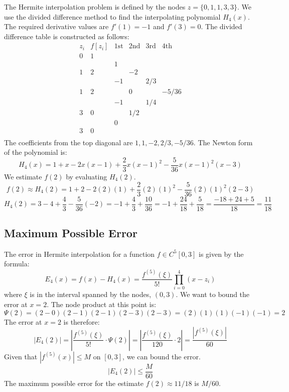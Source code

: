 \documentclass[a4paper]{article}
\begin{document}
The Hermite interpolation problem is defined by the nodes $z = \{0, 1, 1, 3, 3\}$. We use the divided difference method to find the interpolating polynomial $H_4(x)$.
The required derivative values are $f'(1)=-1$ and $f'(3)=0$. The divided difference table is constructed as follows:
\[
\begin{array}{c|ccccc}
z_i & f[z_i] & \text{1st} & \text{2nd} & \text{3rd} & \text{4th} \\
\hline
0 & 1 & & & & \\
& & 1 & & & \\
1 & 2 & & -2 & & \\
& & -1 & & 2/3 & \\
1 & 2 & & 0 & & -5/36 \\
& & -1 & & 1/4 & \\
3 & 0 & & 1/2 & & \\
& & 0 & & & \\
3 & 0 & & & & \\
\end{array}
\]
The coefficients from the top diagonal are $1, 1, -2, 2/3, -5/36$. The Newton form of the polynomial is:
\[
H_4(x) = 1 + x - 2x(x-1) + \frac{2}{3}x(x-1)^2 - \frac{5}{36}x(x-1)^2(x-3)
\]
We estimate $f(2)$ by evaluating $H_4(2)$.
\[
f(2) \approx H_4(2) = 1 + 2 - 2(2)(1) + \frac{2}{3}(2)(1)^2 - \frac{5}{36}(2)(1)^2(2-3)
\]
\[
H_4(2) = 3 - 4 + \frac{4}{3} - \frac{5}{36}(-2) = -1 + \frac{4}{3} + \frac{10}{36} = -1 + \frac{24}{18} + \frac{5}{18} = \frac{-18+24+5}{18} = \frac{11}{18}
\]

\subsection*{Maximum Possible Error}

The error in Hermite interpolation for a function $f \in C^5[0,3]$ is given by the formula:
\[
E_4(x) = f(x) - H_4(x) = \frac{f^{(5)}(\xi)}{5!} \prod_{i=0}^{4} (x-z_i)
\]
where $\xi$ is in the interval spanned by the nodes, $(0,3)$.
We want to bound the error at $x=2$. The node product at this point is:
\[
\Psi(2) = (2-0)(2-1)(2-1)(2-3)(2-3) = (2)(1)(1)(-1)(-1) = 2
\]
The error at $x=2$ is therefore:
\[
|E_4(2)| = \left| \frac{f^{(5)}(\xi)}{5!} \cdot \Psi(2) \right| = \left| \frac{f^{(5)}(\xi)}{120} \cdot 2 \right| = \frac{|f^{(5)}(\xi)|}{60}
\]
Given that $|f^{(5)}(x)| \le M$ on $[0,3]$, we can bound the error.
\[
|E_4(2)| \le \frac{M}{60}
\]
The maximum possible error for the estimate $f(2) \approx 11/18$ is $M/60$.
\end{document}
